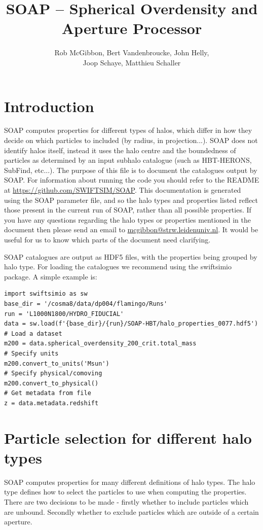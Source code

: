 \documentclass{article}
\title{SOAP -- Spherical Overdensity and Aperture Processor}
\author{Rob McGibbon, Bert Vandenbroucke, John Helly, \\Joop Schaye, Matthieu Schaller}
\date{}
\begin{document}
\maketitle



\section{Introduction}

SOAP computes properties for different types of halos, which differ in how they decide
on which particles to included (by radius, in projection...). SOAP does not identify
halos itself, instead it uses the halo centre and the boundedness of particles as determined
by an input subhalo catalogue (such as HBT-HERONS, SubFind, etc...).
The purpose of this file is to document the catalogues output by SOAP. For information about running
the code you should refer to the README at \href{https://github.com/SWIFTSIM/SOAP}{https://github.com/SWIFTSIM/SOAP}.
This documentation is generated using the SOAP parameter file, and so the halo types and properties 
listed reflect those present in the current run of SOAP, rather than all possible properties.
If you have any questions regarding the halo types or properties mentioned in the document then
please send an email to \href{mailto:mcgibbon@strw.leidenuniv.nl}{mcgibbon@strw.leidenuniv.nl}.
It would be useful for us to know which parts of the document need clarifying.

SOAP catalogues are output as HDF5 files, with the properties being grouped by halo type.
For loading the catalogues we recommend using the swiftsimio package. A simple example is:
\begin{verbatim}
import swiftsimio as sw
base_dir = '/cosma8/data/dp004/flamingo/Runs'
run = 'L1000N1800/HYDRO_FIDUCIAL'
data = sw.load(f'{base_dir}/{run}/SOAP-HBT/halo_properties_0077.hdf5')
# Load a dataset
m200 = data.spherical_overdensity_200_crit.total_mass
# Specify units
m200.convert_to_units('Msun')
# Specify physical/comoving
m200.convert_to_physical()
# Get metadata from file
z = data.metadata.redshift
\end{verbatim}

\section{Particle selection for different halo types}

SOAP computes properties for many different definitions of halo types. The halo type defines how to select the
particles to use when computing the properties. There are two decisions to be made - firstly whether
to include particles which are unbound. Secondly whether to exclude particles which are outside of a certain
aperture.
\end{document}
